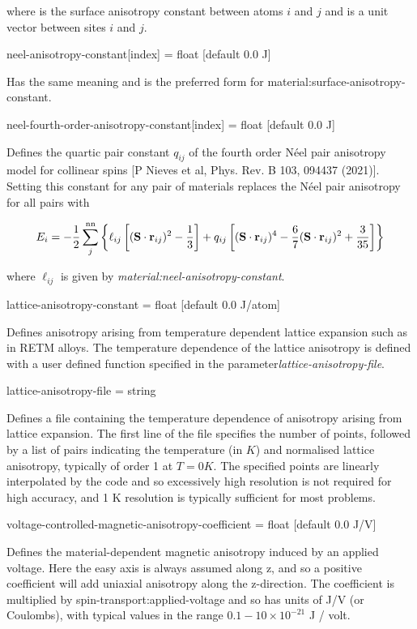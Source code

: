 \noindent where \ksurf is the surface anisotropy constant between atoms $i$ and $j$ and \rij is a unit vector between sites $i$ and $j$.

{\zicf neel-anisotropy-constant[index] = float [default 0.0 J]}
Has the same meaning and is the preferred form for material:surface-anisotropy-constant.

{\zicf neel-fourth-order-anisotropy-constant[index] = float [default 0.0 J]}
Defines the quartic pair constant $q_{ij}$ of the fourth order N\'eel pair anisotropy model for collinear spins [P Nieves et al, Phys. Rev. B 103, 094437 (2021)]. Setting this constant for any pair of materials replaces the N\'eel pair anisotropy for all pairs with

\begin{equation*}
E_i = -\frac{1}{2} \sum_j^{\mathrm{nn}} \left\{ \ell_{ij} \left[ (\mathbf{S} \cdot \mathbf{r}_{ij} )^2 - \frac{1}{3} \right] + q_{ij} \left[ (\mathbf{S} \cdot \mathbf{r}_{ij} )^4 - \frac{6}{7} (\mathbf{S} \cdot \mathbf{r}_{ij} )^2 + \frac{3}{35} \right] \right\}
\end{equation*}

\noindent where $\ell_{ij}$ is given by \textit{material:neel-anisotropy-constant}.

{\zicf lattice-anisotropy-constant = float [default 0.0 J/atom]}
Defines anisotropy arising from temperature dependent lattice expansion such as in RETM alloys. The temperature dependence of the lattice anisotropy is defined with a user defined function specified in the parameter\textit{lattice-anisotropy-file}.

{\zicf lattice-anisotropy-file = string} Defines a file containing the temperature dependence of anisotropy arising from lattice expansion. The first line of the file specifies the number of points, followed by a list of pairs indicating the temperature (in $K$) and normalised lattice anisotropy, typically of order 1 at $T = 0 K$. The specified points are
linearly interpolated by the code and so excessively high resolution is not required for high accuracy, and 1 K resolution is typically sufficient for most problems.

{\zicf voltage-controlled-magnetic-anisotropy-coefficient = float [default 0.0 J/V]}
Defines the material-dependent magnetic anisotropy induced by an applied voltage.
Here the easy axis is always assumed along z, and so a positive coefficient will
add uniaxial anisotropy along the z-direction. The coefficient is multiplied by
spin-transport:applied-voltage and so has units of J/V (or Coulombs), with typical
values in the range $0.1-10 \times 10^{-21}$ J / volt.

